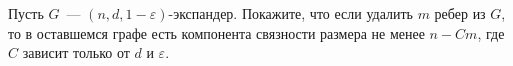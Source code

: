 Пусть $G$~--- $(n, d, 1 - \varepsilon)$-экспандер. Покажите, что если удалить $m$ ребер из $G$, то в
оставшемся графе есть компонента связности размера не менее $n - C m$, где $C$ зависит только от $d$ и
$\varepsilon$.
